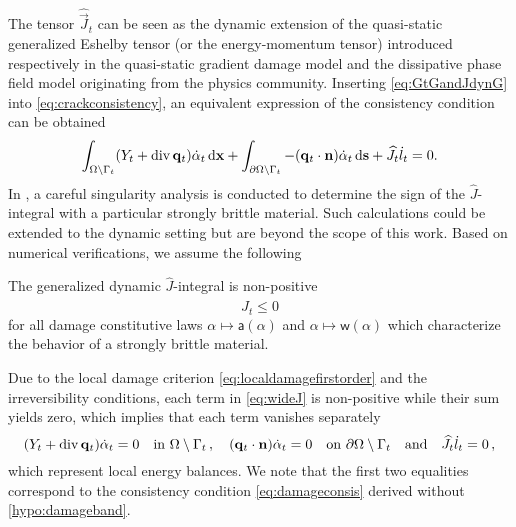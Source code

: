 The tensor $\widehat{\vec{J}}_t$ can be seen as the dynamic extension of the quasi-static generalized Eshelby tensor (or the energy-momentum tensor) \cite{SicsicMarigo:2013,HakimKarma:2009} introduced respectively in the quasi-static gradient damage model and the dissipative phase field model originating from the physics community. Inserting \eqref{eq:GtGandJdynG} into \eqref{eq:crackconsistency}, an equivalent expression of the consistency condition can be obtained
\begin{equation} \label{eq:wideJ}
\int_\domaint(Y_t+\div\vec{q}_t)\dot{\alpha}_t\dx+\int_{\partial\Omega\setminus\Gamma_t}-(\vec{q}_t\cdot\vec{n})\dot{\alpha}_t\ds+\widehat{J}_t\dot{l}_t=0.
\end{equation}
In \cite{SicsicMarigo:2013}, a careful singularity analysis is conducted to determine the sign of the $\widehat{J}$-integral with a particular strongly brittle material. Such calculations could be extended to the dynamic setting but are beyond the scope of this work. Based on numerical verifications, we assume the following
\begin{hypothesis} \label{eq:Jleq0}
The generalized dynamic $\widehat{J}$-integral is non-positive
\begin{equation} \label{eq:stab}
\widehat{J}_t\leq 0
\end{equation}
for all damage constitutive laws $\alpha\mapsto\mathsf{a}(\alpha)$ and $\alpha\mapsto\mathsf{w}(\alpha)$ which characterize the behavior of a strongly brittle material.
\end{hypothesis}
Due to the local damage criterion \eqref{eq:localdamagefirstorder} and the irreversibility conditions, each term in \eqref{eq:wideJ} is non-positive while their sum yields zero, which implies that each term vanishes separately
\begin{equation} \label{eq:ebG}
(Y_t+\div\vec{q}_t)\dot{\alpha}_t=0\quad\text{in }\domaint\,,\quad(\vec{q}_t\cdot\vec{n})\dot{\alpha}_t=0\quad\text{on }\partial\Omega\setminus\Gamma_t\quad\text{and}\quad\widehat{J}_t\dot{l}_t=0\,,
\end{equation}
which represent local energy balances. We note that the first two equalities correspond to the consistency condition \eqref{eq:damageconsis} derived without \cref{hypo:damageband}.

